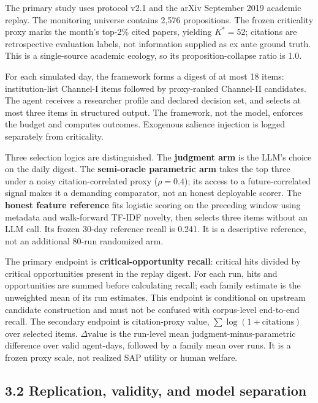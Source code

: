 \documentclass[
  conference,10pt]{IEEEtran}
\begin{document}
The primary study uses protocol v2.1 and the arXiv September 2019 academic replay. The monitoring universe contains 2,576 propositions. The frozen criticality proxy marks the month's top-2\% cited papers, yielding \(K^*=52\); citations are retrospective evaluation labels, not information supplied as ex ante ground truth. This is a single-source academic ecology, so its proposition-collapse ratio is 1.0.

For each simulated day, the framework forms a digest of at most 18 items: institution-list Channel-I items followed by proxy-ranked Channel-II candidates. The agent receives a researcher profile and declared decision set, and selects at most three items in structured output. The framework, not the model, enforces the budget and computes outcomes. Exogenous salience injection is logged separately from criticality.

Three selection logics are distinguished. The \textbf{judgment arm} is the LLM's choice on the daily digest. The \textbf{semi-oracle parametric arm} takes the top three under a noisy citation-correlated proxy (\(\rho=0.4\)); its access to a future-correlated signal makes it a demanding comparator, not an honest deployable scorer. The \textbf{honest feature reference} fits logistic scoring on the preceding window using metadata and walk-forward TF-IDF novelty, then selects three items without an LLM call. Its frozen 30-day reference recall is 0.241. It is a descriptive reference, not an additional 80-run randomized arm.

The primary endpoint is \textbf{critical-opportunity recall}: critical hits divided by critical opportunities present in the replay digest. For each run, hits and opportunities are summed before calculating recall; each family estimate is the unweighted mean of its run estimates. This endpoint is conditional on upstream candidate construction and must not be confused with corpus-level end-to-end recall. The secondary endpoint is citation-proxy value, \(\sum\log(1+\mathrm{citations})\) over selected items. \(\Delta\mathrm{value}\) is the run-level mean judgment-minus-parametric difference over valid agent-days, followed by a family mean over runs. It is a frozen proxy scale, not realized SAP utility or human welfare.

\subsection{3.2 Replication, validity, and model separation}\label{replication-validity-and-model-separation}
\end{document}
